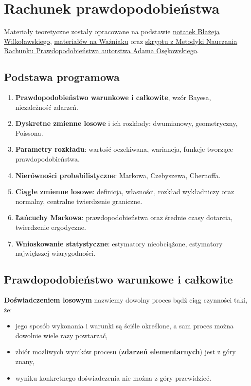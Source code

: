 \chapter{Rachunek prawdopodobieństwa}

Materiały teoretyczne zostały opracowane na podstawie \href{https://drive.google.com/file/d/1WlyT05bbN8DMYJ59sRA7HeTXgpvc7yQ4/view}{notatek Błażeja Wilkoławskiego}, \href{https://wazniak.mimuw.edu.pl/index.php?title=Rachunek_prawdopodobie%C5%84stwa_i_statystyka}{materiałów na Ważniaku} oraz \href{https://www.mimuw.edu.pl/~ados/MNRP/MNRP.pdf}{skryptu z Metodyki Nauczania Rachunku Prawdopodobieństwa autorstwa Adama Osękowskiego}.

\section*{Podstawa programowa}
\begin{enumerate}
    \item \textbf{Prawdopodobieństwo warunkowe i całkowite}, wzór Bayesa, niezależność zdarzeń.
    \item \textbf{Dyskretne zmienne losowe} i ich rozkłady: dwumianowy, geometryczny, Poissona.
    \item \textbf{Parametry rozkładu}: wartość oczekiwana, wariancja, funkcje tworzące prawdopodobieństwa.
    \item \textbf{Nierówności probabilistyczne}: Markowa, Czebyszewa, Chernoffa.
    \item \textbf{Ciągłe zmienne losowe}: definicja, własności, rozkład wykładniczy oraz normalny, centralne twierdzenie graniczne.
    \item \textbf{Łańcuchy Markowa}: prawdopodobieństwa oraz średnie czasy dotarcia, twierdzenie ergodyczne.
    \item \textbf{Wnioskowanie statystyczne}: estymatory nieobciążone, estymatory największej wiarygodności.
\end{enumerate}

\section{Prawdopodobieństwo warunkowe i całkowite}

\textbf{Doświadczeniem losowym} nazwiemy dowolny proces bądź ciąg czynności taki, że:
\begin{itemize}
    \item jego sposób wykonania i warunki są ściśle określone, a sam proces można dowolnie wiele razy powtarzać,
    \item zbiór możliwych wyników procesu (\textbf{zdarzeń elementarnych}) jest z góry znany,
    \item wyniku konkretnego doświadczenia nie można z góry przewidzieć.
\end{itemize}

